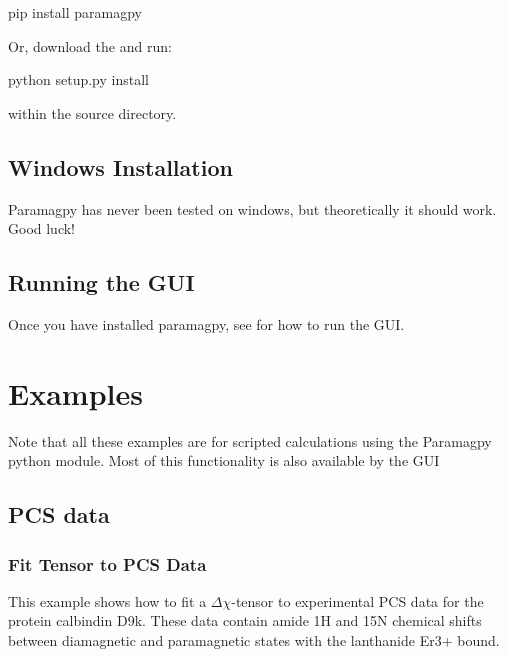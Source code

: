 \documentclass[a4paper,10pt,english,openany,oneside]{sphinxmanual}
\begin{document}
%
\begin{sphinxVerbatim}[commandchars=\\\{\}]
\PYGZdl{} pip install paramagpy
\end{sphinxVerbatim}

Or, download the  and run:

%
\begin{sphinxVerbatim}[commandchars=\\\{\}]
\PYGZdl{} python setup.py install
\end{sphinxVerbatim}

within the source directory.


\subsection{Windows Installation}
\label{\detokenize{install:windows-installation}}
Paramagpy has never been tested on windows, but theoretically it should work. Good luck!


\subsection{Running the GUI}
\label{\detokenize{install:running-the-gui}}
Once you have installed paramagpy, see {\hyperref[\detokenize{paramagpy_gui:paramagpy-gui}]{}} for how to run the GUI.


\section{Examples}
\label{\detokenize{examples/index:examples}}\label{\detokenize{examples/index:examples-index}}\label{\detokenize{examples/index::doc}}
Note that all these examples are for scripted calculations using the Paramagpy python module. Most of this functionality is also available by the GUI {\hyperref[\detokenize{paramagpy_gui:paramagpy-gui}]{}}


\subsection{PCS data}
\label{\detokenize{examples/index:pcs-data}}

\subsubsection{Fit Tensor to PCS Data}
\label{\detokenize{examples/pcs_fit:fit-tensor-to-pcs-data}}\label{\detokenize{examples/pcs_fit:pcs-fit}}\label{\detokenize{examples/pcs_fit::doc}}
This example shows how to fit a \({\Delta\chi}\)-tensor to experimental PCS data for the protein calbindin D9k. These data contain amide 1H and 15N chemical shifts between diamagnetic and paramagnetic states with the lanthanide Er3+ bound.
\end{document}
